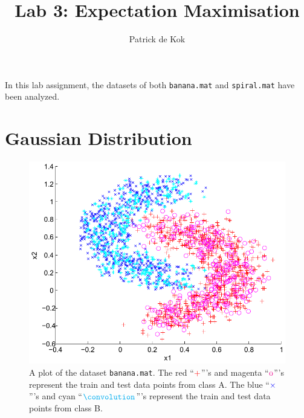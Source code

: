 \documentclass[a4paper,11pt]{article}
\title{Lab 3: Expectation Maximisation}
\author{Patrick de Kok}
\begin{document}
\maketitle

In this lab assignment, the datasets of both \texttt{banana.mat} and \texttt{spiral.mat} have been analyzed. 

\section{Gaussian Distribution}
\begin{figure}
\begin{center}
\caption{A plot of the dataset \texttt{banana.mat}.  The red ``$\color{red}+$'''s and magenta ``$\color{magenta}\mbox{o}$'''s represent the train and test data points from class A.  The blue ``$\color{blue}\times$'''s and cyan ``$\color{cyan}\convolution$'''s represent the train and test data points from class B.}
\label{fig:banana}
\includegraphics[width=\textwidth]{banana}
\end{center}
\end{figure}
\end{document}
